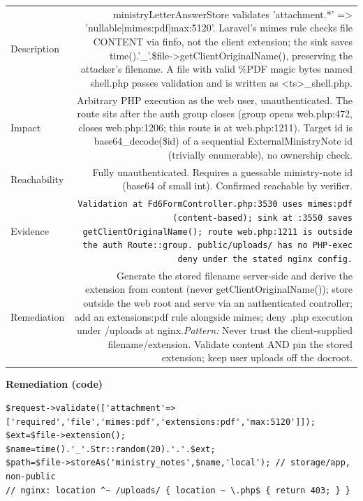 \documentclass[11pt,a4paper]{article}
\begin{document}
\vspace{6pt}
{\renewcommand{\arraystretch}{1.35}%
\begin{tabularx}{\textwidth}{L R}
\toprule
Description & ministryLetterAnswerStore validates 'attachment.*' =\textgreater{} 'nullable|mimes:pdf|max:5120'. Laravel's mimes rule checks file CONTENT via finfo, not the client extension; the sink saves time().'\_'.\$file-\textgreater{}getClientOriginalName(), preserving the attacker's filename. A file with valid \%PDF magic bytes named shell.php passes validation and is written as \textless{}ts\textgreater{}\_shell.php. \\
Impact & Arbitrary PHP execution as the web user, unauthenticated. The route sits after the auth group closes (group opens web.php:472, closes web.php:1206; this route is at web.php:1211). Target id is base64\_decode(\$id) of a sequential ExternalMinistryNote id (trivially enumerable), no ownership check. \\
Reachability & Fully unauthenticated. Requires a guessable ministry-note id (base64 of small int). Confirmed reachable by verifier. \\
Evidence & \texttt{\small Validation at Fd6FormController.php:3530 uses mimes:pdf (content-based); sink at :3550 saves getClientOriginalName(); route web.php:1211 is outside the auth Route::group. public/uploads/ has no PHP-exec deny under the stated nginx config.} \\
Remediation & Generate the stored filename server-side and derive the extension from content (never getClientOriginalName()); store outside the web root and serve via an authenticated controller; add an extensions:pdf rule alongside mimes; deny .php execution under /uploads at nginx.\newline\emph{Pattern:} Never trust the client-supplied filename/extension. Validate content AND pin the stored extension; keep user uploads off the docroot. \\
\bottomrule
\end{tabularx}}

\vspace{4pt}\noindent\textbf{Remediation (code)}\par
\begin{lstlisting}
$request->validate(['attachment'=>['required','file','mimes:pdf','extensions:pdf','max:5120']]);
$ext=$file->extension();
$name=time().'_'.Str::random(20).'.'.$ext;
$path=$file->storeAs('ministry_notes',$name,'local'); // storage/app, non-public
// nginx: location ^~ /uploads/ { location ~ \.php$ { return 403; } }
\end{lstlisting}
\end{document}
